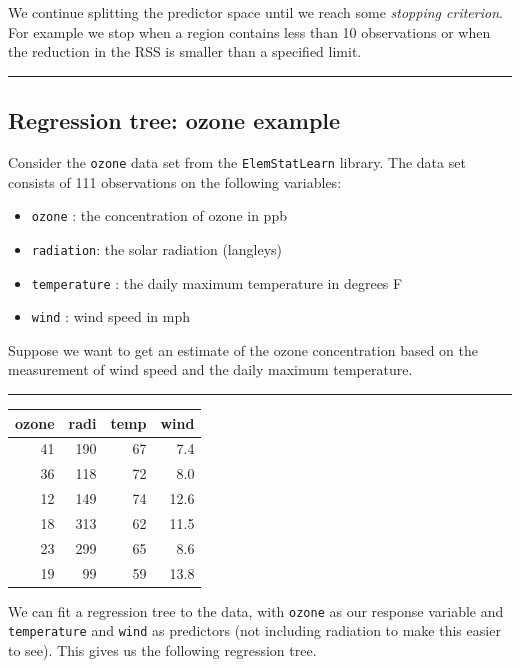 \documentclass[]{article}
\providecommand{\tightlist}{%
  \setlength{\itemsep}{0pt}\setlength{\parskip}{0pt}}
\begin{document}
We continue splitting the predictor space until we reach some
\emph{stopping criterion}. For example we stop when a region contains
less than 10 observations or when the reduction in the RSS is smaller
than a specified limit.

\begin{center}\rule{0.5\linewidth}{\linethickness}\end{center}

\hypertarget{regression-tree-ozone-example}{%
\subsection{Regression tree: ozone
example}\label{regression-tree-ozone-example}}

Consider the \texttt{ozone} data set from the \texttt{ElemStatLearn}
library. The data set consists of 111 observations on the following
variables:

\begin{itemize}
\tightlist
\item
  \texttt{ozone} : the concentration of ozone in ppb
\item
  \texttt{radiation}: the solar radiation (langleys)
\item
  \texttt{temperature} : the daily maximum temperature in degrees F
\item
  \texttt{wind} : wind speed in mph
\end{itemize}

Suppose we want to get an estimate of the ozone concentration based on
the measurement of wind speed and the daily maximum temperature.

\begin{center}\rule{0.5\linewidth}{\linethickness}\end{center}

\begin{tabular}{r|r|r|r}
\hline
ozone & radi & temp & wind\\
\hline
41 & 190 & 67 & 7.4\\
\hline
36 & 118 & 72 & 8.0\\
\hline
12 & 149 & 74 & 12.6\\
\hline
18 & 313 & 62 & 11.5\\
\hline
23 & 299 & 65 & 8.6\\
\hline
19 & 99 & 59 & 13.8\\
\hline
\end{tabular}

We can fit a regression tree to the data, with \texttt{ozone} as our
response variable and \texttt{temperature} and \texttt{wind} as
predictors (not including radiation to make this easier to see). This
gives us the following regression tree.
\end{document}

